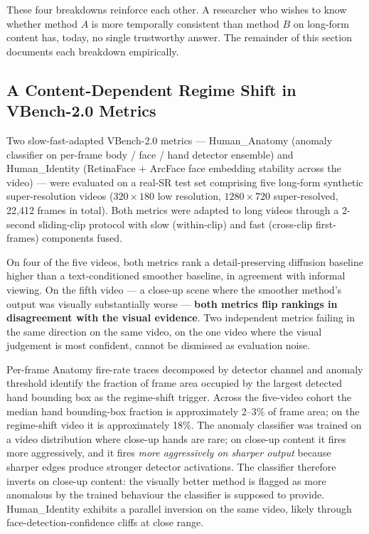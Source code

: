 These four breakdowns reinforce each other. A researcher who wishes to know whether method
$A$ is more temporally consistent than method $B$ on long-form content has, today, no
single trustworthy answer. The remainder of this section documents each breakdown
empirically.

\subsection{A Content-Dependent Regime Shift in VBench-2.0 Metrics}
\label{sec:problem:regime}

Two slow-fast-adapted VBench-2.0 metrics --- Human\_Anatomy (anomaly classifier on per-frame
body / face / hand detector ensemble) and Human\_Identity (RetinaFace + ArcFace face
embedding stability across the video) --- were evaluated on a real-SR test set comprising
five long-form synthetic super-resolution videos ($320\!\times\!180$ low resolution,
$1280\!\times\!720$ super-resolved, 22{,}412 frames in total). Both metrics were adapted
to long videos through a 2-second sliding-clip protocol with slow (within-clip) and fast
(cross-clip first-frames) components fused.

On four of the five videos, both metrics rank a detail-preserving diffusion baseline higher
than a text-conditioned smoother baseline, in agreement with informal viewing. On the fifth
video --- a close-up scene where the smoother method's output was visually substantially
worse --- \textbf{both metrics flip rankings in disagreement with the visual evidence}.
Two independent metrics failing in the same direction on the same video, on the one video
where the visual judgement is most confident, cannot be dismissed as evaluation noise.

Per-frame Anatomy fire-rate traces decomposed by detector channel and anomaly threshold
identify the fraction of frame area occupied by the largest detected hand bounding box as
the regime-shift trigger. Across the five-video cohort the median hand bounding-box
fraction is approximately 2--3\% of frame area; on the regime-shift video it is
approximately 18\%. The anomaly classifier was trained on a video distribution where
close-up hands are rare; on close-up content it fires more aggressively, and it fires
\emph{more aggressively on sharper output} because sharper edges produce stronger detector
activations. The classifier therefore inverts on close-up content: the visually better
method is flagged as more anomalous by the trained behaviour the classifier is supposed
to provide. Human\_Identity exhibits a parallel inversion on the same video, likely through
face-detection-confidence cliffs at close range.

